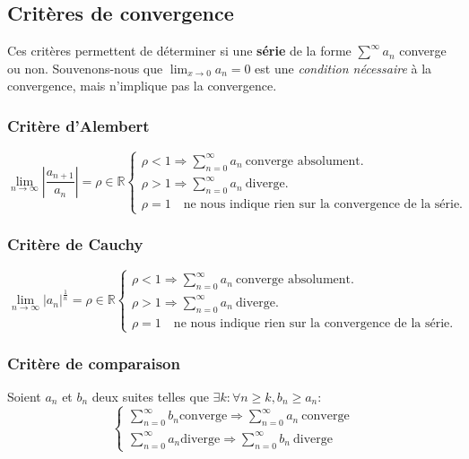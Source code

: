 \documentclass{article}
\begin{document}
\subsection{Critères de convergence}
Ces critères permettent de déterminer si une \textbf{série} de la forme \(\sum^\infty a_n\) converge ou non. Souvenons-nous que \(\lim_{x \to 0} a_n = 0\) est une \emph{condition nécessaire} à la convergence, mais n'implique pas la convergence. \\

\subsubsection{Critère d'Alembert}
\begin{equation*}
	\lim_{n \to \infty} \left | \dfrac{a_{n+1}}{a_n} \right | = \rho \in \mathbb{R} 
	\begin{cases}
		\rho < 1 \Rightarrow \sum_{n=0}^\infty a_n \ \text{converge absolument.} \\
		\rho > 1 \Rightarrow \sum_{n=0}^\infty a_n \ \text{diverge.} \\
		\rho = 1 \quad \text{ne nous indique rien sur la convergence de la série.}
	\end{cases}
\end{equation*}

\subsubsection{Critère de Cauchy}
\begin{equation*}
	\lim_{n \to \infty} \left | a_n \right |^{\frac{1}{n}} = \rho \in \mathbb{R}
	\begin{cases}
		\rho < 1 \Rightarrow \sum_{n=0}^\infty a_n \ \text{converge absolument.} \\
		\rho > 1 \Rightarrow \sum_{n=0}^\infty a_n \ \text{diverge.} \\
		\rho = 1 \quad \text{ne nous indique rien sur la convergence de la série.}
	\end{cases}
\end{equation*}

\subsubsection{Critère de comparaison}
Soient \(a_n\) et \(b_n\) deux suites telles que \(\exists k : \forall n \geq k, b_n \geq a_n\):
\begin{equation*}
	\begin{cases}
		\sum_{n=0}^\infty b_n \text{converge} \Rightarrow \sum_{n=0}^\infty a_n \ \text{converge} \\
		\sum_{n=0}^\infty a_n \text{diverge} \Rightarrow \sum_{n=0}^\infty b_n \ \text{diverge}
	\end{cases}
\end{equation*}
\end{document}
